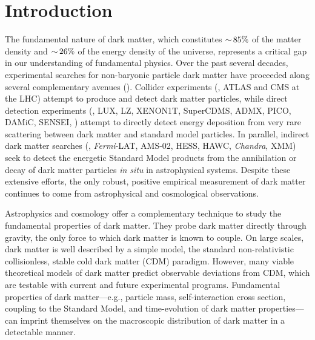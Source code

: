 \chapter{Introduction} 
\label{sec:intro}
\bigskip
{}

The fundamental nature of dark matter, which constitutes $ {\sim}\, 85\%$ of the matter density and $ {\sim}\, 26\%$ of the energy density of the universe, represents a critical gap in our understanding of fundamental physics.
Over the past several decades, experimental searches for non-baryonic particle dark matter have proceeded along several complementary avenues ().
Collider experiments (\eg, ATLAS and CMS at the LHC) attempt to produce and detect dark matter particles, while  %
direct detection experiments (\eg, LUX, LZ, XENON1T, SuperCDMS, ADMX, PICO, DAMiC, SENSEI, \etc) attempt to directly detect energy deposition from very rare scattering between dark matter and standard model particles.
In parallel, indirect dark matter searches (\eg, {\it Fermi}-LAT, AMS-02, HESS, HAWC, {\it Chandra}, XMM) seek to detect the energetic Standard Model products from the annihilation or decay of dark matter particles {\it in situ} in astrophysical systems. %
Despite these extensive efforts, the only robust, positive empirical measurement of dark matter continues to come from astrophysical and cosmological observations. 

Astrophysics and cosmology offer a complementary technique to study the fundamental properties of dark matter. 
They probe dark matter directly through gravity, the only force to which dark matter is known to couple. On large scales, dark matter is well described by a simple model, the standard non-relativistic collisionless, stable cold dark matter (CDM) paradigm.
However, many viable theoretical models of dark matter predict observable deviations from CDM, which are testable with current and future experimental programs.
Fundamental properties of dark matter---e.g., particle mass, self-interaction cross section, coupling to the Standard Model, and time-evolution of dark matter properties---can imprint themselves on the macroscopic distribution of dark matter in a detectable manner.

